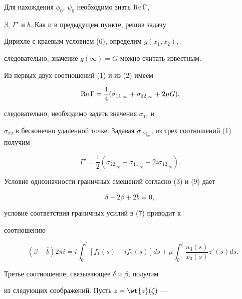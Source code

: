 Для нахождения $\phi_0$, $\psi_0$ необходимо знать $\operatorname{Re} \Gamma$,


$\beta$, $\Gamma'$ и $b$. Как и в предыдущем пункте, решив задачу


Дирихле с краевым условием (6), определим $g(x_1,x_2)$, 


следовательно, значение $g(\infty) = G$ можно считать известным.


Из первых двух соотношений (1) и из (2) имеем


\begin{equation}


\re \Gamma = \frac{1}{4} (\sigma_{11 |_{\infty}} +


\sigma_{22 |_{\infty}} + 2\mu G), 


\end{equation}


следовательно, необходимо задать значения $\sigma_{11}$ и


$\sigma_{22}$ в бесконечно удаленной точке. Задавая $\sigma_{12


|_{\infty}}$, из трех соотношений (1) получим


\begin{equation}


\Gamma' = \frac{1}{2} (\sigma_{22 |_{\infty}} -


\sigma_{11 |_{\infty}} + 2 i \sigma_{12 |_{\infty}}).


\end{equation}


Условие однозначности граничных смещений согласно (3) и (9) дает


\begin{equation}


\delta - 2\beta + 2\overline{b} = 0,


\end{equation}


условие соответствия граничных усилий в (7) приводит к


соотношению


\begin{equation}


-(\beta - \overline{b}) 2\pi i = i \int_0^l [f_1(s) + i f_2(s)]ds


+ \mu\int_0^l \frac{u_3(s)}{x_3(s)} z'(s) ds.


\end{equation}


Третье соотношение, связывающее $\delta$ и $\beta$, получим


из следующих соображений. Пусть $z=\wt{z}(\zeta)$ ---


